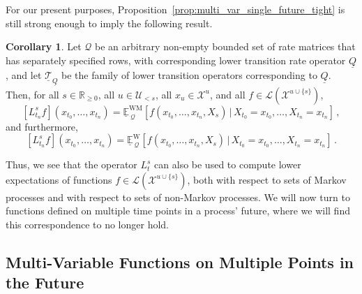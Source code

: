 \documentclass[10pt]{paper}
\theoremstyle{definition}
\newtheorem{proposition}[theorem]{Proposition}
\newtheorem{corollary}[theorem]{Corollary}
\newcommand{\reals}{\mathbb{R}}
\newcommand{\realspos}{\reals_{>0}}
\newcommand{\realsnonneg}{\reals_{\geq 0}}
\newcommand{\states}{\mathcal{X}}
\newcommand{\processes}{\mathbb{P}}
\newcommand{\mprocesses}{\processes^{\mathrm{M}}}
\newcommand{\gambles}{\mathcal{L}}
\newcommand{\rateset}{\mathcal{Q}}
\newcommand{\lrate}{\underline{Q}}
\newcommand{\norm}[1]{\left\lVert #1 \right\rVert}
\begin{document}
For our present purposes, Proposition~\ref{prop:multi_var_single_future_tight} is still strong enough to imply the following result.


\begin{corollary}\label{cor:inf_works_for_single_future_var}
Let $\rateset$ be an arbitrary non-empty bounded set of rate matrices that has separately specified rows, with corresponding lower transition rate operator $\lrate$, and let $\underline{\mathcal{T}}_{\lrate}$ be the family of lower transition operators corresponding to $\lrate$. Then, for all $s\in\realsnonneg$, all $u\in\mathcal{U}_{<s}$, all $x_u\in\states^u$, and all $f\in\gambles(\states^{u\cup\{s\}})$,
\begin{equation*}
\left[L_{t_n}^s f\right](x_{t_0},\ldots,x_{t_n}) = \underline{\mathbb{E}}^{\mathrm{WM}}_{\,\rateset}[f(x_{t_0},\ldots,x_{t_n},X_s)\,\vert\,X_{t_0}=x_{t_0},\ldots,X_{t_n}=x_{t_n}]\,,
\end{equation*}
and furthermore,
\begin{equation*}
\left[L_{t_n}^s f\right](x_{t_0},\ldots,x_{t_n}) = \underline{\mathbb{E}}^\mathrm{W}_{\,\rateset}[f(x_{t_0},\ldots,x_{t_n},X_s)\,\vert\,X_{t_0}=x_{t_0},\ldots,X_{t_n}=x_{t_n}]\,.
\end{equation*}
\end{corollary}

Thus, we see that the operator $L_t^s$ can also be used to compute lower expectations of functions $f\in\gambles(\states^{u\cup\{s\}})$, both with respect to sets of Markov processes and with respect to sets of non-Markov processes. We will now turn to functions defined on multiple time points in a process' future, where we will find this correspondence to no longer hold.


\subsection{Multi-Variable Functions on Multiple Points in the Future}\label{sec:decomposition}
\end{document}
